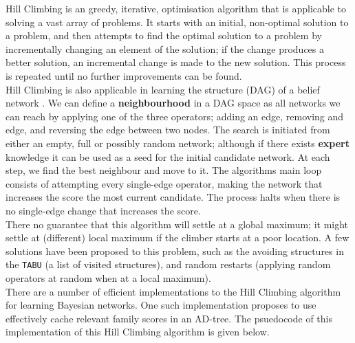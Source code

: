 Hill Climbing is an greedy, iterative, optimisation algorithm that is applicable to solving a vast array of problems. It starts with an initial, non-optimal solution to a problem, and then attempts to find the optimal solution to a problem by incrementally changing an element of the solution; if the change produces a better solution, an incremental change is made to the new solution. This process is repeated until no further improvements can be found. \\

Hill Climbing is also applicable in learning the structure (DAG) of a belief network \cite{margaritis2003learning}. We can define a \textbf{neighbourhood} in a DAG space as all networks we can reach by applying one of the three operators; adding an edge, removing and edge, and reversing the edge between two nodes\cite{brandonmalone}. The search is initiated from either an empty, full or possibly random network; although if there exists \textbf{expert} knowledge it can be used as a seed for the initial candidate network. At each step, we find the best neighbour and move to it. The algorithms main loop consists of attempting every single-edge operator, making the network that increases the score the most current candidate. The process halts when there is no single-edge change that increases the score.  \\

There no guarantee that this algorithm will settle at a global maximum; it might settle at (different) local maximum if the climber starts at a poor location. A few solutions have been proposed to this problem, such as the avoiding structures in the \texttt{TABU} (a list of visited structures), and random restarts (applying random operators at random when at a local maximum). \\

There are a number of efficient implementations to the Hill Climbing algorithm for learning Bayesian networks. One such implementation proposes to use effectively cache relevant family scores in an AD-tree. The psuedocode of this implementation of this Hill Climbing algorithm\cite{brandonmalone} is given below.


